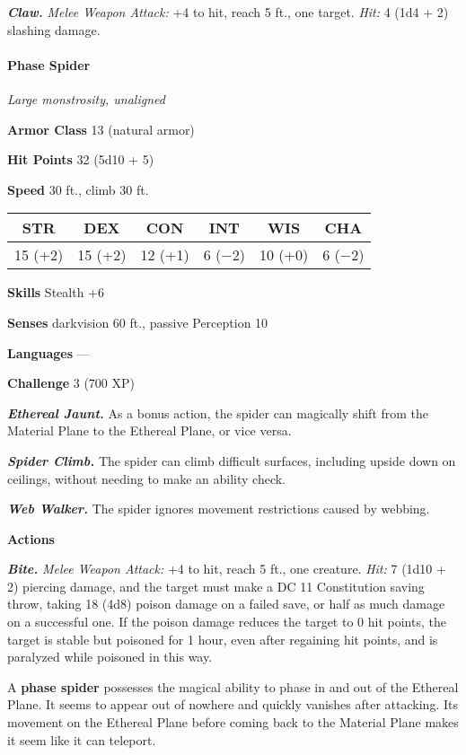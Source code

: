 \documentclass[
]{article}
\begin{document}
\emph{\textbf{Claw.}} \emph{Melee Weapon Attack:} +4 to hit, reach 5
ft., one target. \emph{Hit:} 4 (1d4 + 2) slashing damage.

\hypertarget{phase-spider}{%
\paragraph{Phase Spider}\label{phase-spider}}

\emph{Large monstrosity, unaligned}

\textbf{Armor Class} 13 (natural armor)

\textbf{Hit Points} 32 (5d10 + 5)

\textbf{Speed} 30 ft., climb 30 ft.

\begin{longtable}[]{@{}cccccc@{}}
\toprule
STR & DEX & CON & INT & WIS & CHA\tabularnewline
\midrule
\endhead
15 (+2) & 15 (+2) & 12 (+1) & 6 (−2) & 10 (+0) & 6 (−2)\tabularnewline
\bottomrule
\end{longtable}

\textbf{Skills} Stealth +6

\textbf{Senses} darkvision 60 ft., passive Perception 10

\textbf{Languages} ---

\textbf{Challenge} 3 (700 XP)

\emph{\textbf{Ethereal Jaunt.}} As a bonus action, the spider can
magically shift from the Material Plane to the Ethereal Plane, or vice
versa.

\emph{\textbf{Spider Climb.}} The spider can climb difficult surfaces,
including upside down on ceilings, without needing to make an ability
check.

\emph{\textbf{Web Walker.}} The spider ignores movement restrictions
caused by webbing.

\textbf{Actions}

\emph{\textbf{Bite.}} \emph{Melee Weapon Attack:} +4 to hit, reach 5
ft., one creature. \emph{Hit:} 7 (1d10 + 2) piercing damage, and the
target must make a DC 11 Constitution saving throw, taking 18 (4d8)
poison damage on a failed save, or half as much damage on a successful
one. If the poison damage reduces the target to 0 hit points, the target
is stable but poisoned for 1 hour, even after regaining hit points, and
is paralyzed while poisoned in this way.

A \textbf{phase spider} possesses the magical ability to phase in and
out of the Ethereal Plane. It seems to appear out of nowhere and quickly
vanishes after attacking. Its movement on the Ethereal Plane before
coming back to the Material Plane makes it seem like it can teleport.
\end{document}
